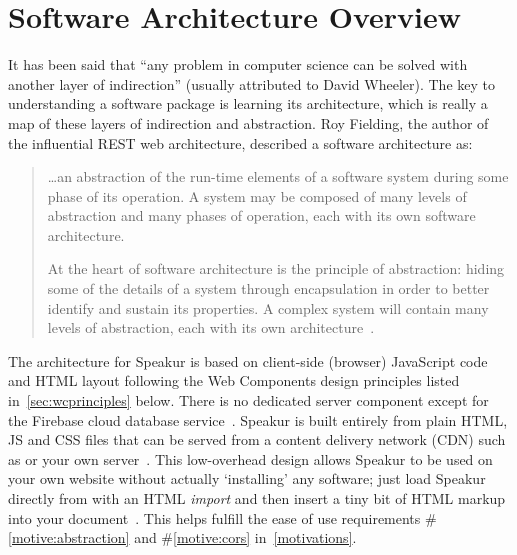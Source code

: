 \section{Software Architecture Overview}
It has been said that ``any problem in computer science can be solved with another layer of indirection'' (usually attributed to David Wheeler).
The key to understanding a software package is learning its architecture,
which is really a map of these layers of indirection and abstraction.
Roy Fielding, the author of the influential REST web architecture, described a software architecture as:

\begin{quote}
\dots an abstraction of the run-time elements of a software system during some phase of its operation. A system may be composed of many levels of abstraction and many phases of operation, each with its own software architecture.

At the heart of software architecture is the principle of abstraction: hiding some of the details of a system through encapsulation in order to better identify and sustain its properties. A complex system will contain many levels of abstraction, each with its own architecture~\cite{fielding2000}.
\end{quote}

The architecture for Speakur is based on client-side (browser) JavaScript code and HTML layout following the Web Components design principles listed in~\cref{sec:wcprinciples} below. 
There is no dedicated server component except for the Firebase cloud database service~\cite{firebasecontributors2015}.
Speakur is built entirely from plain HTML, JS and CSS files that can be served from a content delivery network (CDN) 
such as  or your own server~\cite{landers2015-d}.
This low-overhead design allows Speakur to be used on your own website without actually `installing' any software;
just load Speakur directly from  with an HTML \textit{import}
and then insert a tiny bit of HTML markup into your document~\cite{landers2015-d}.
This helps fulfill the ease of use requirements 
\#\ref{motive:abstraction} and \#\ref{motive:cors}
in~\cref{motivations}.

